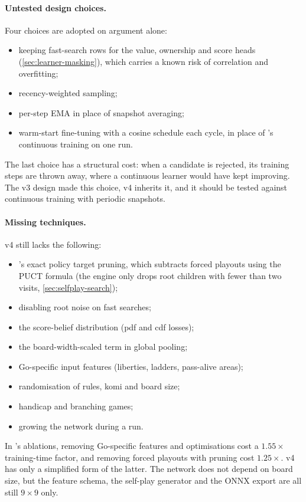 \paragraph{Untested design choices.}
Four choices are adopted on argument alone:
\begin{itemize}
  \item keeping fast-search rows for the value, ownership and score heads
        (\cref{sec:learner-masking}), which carries a known risk of correlation and
        overfitting;
  \item recency-weighted sampling;
  \item per-step EMA in place of snapshot averaging;
  \item warm-start fine-tuning with a cosine schedule each cycle, in place of \katago{}'s
        continuous training on one run.
\end{itemize}
The last choice has a structural cost: when a candidate is rejected, its training steps
are thrown away, where a continuous learner would have kept improving. The v3 design made
this choice, v4 inherits it, and it should be tested against continuous training with
periodic snapshots.

\paragraph{Missing \katago{} techniques.}
v4 still lacks the following:
\begin{itemize}
  \item \katago{}'s exact policy target pruning, which subtracts forced playouts using the
        PUCT formula (the engine only drops root children with fewer than two visits,
        \cref{sec:selfplay-search});
  \item disabling root noise on fast searches;
  \item the score-belief distribution (pdf and cdf losses);
  \item the board-width-scaled term in global pooling;
  \item Go-specific input features (liberties, ladders, pass-alive areas);
  \item randomisation of rules, komi and board size;
  \item handicap and branching games;
  \item growing the network during a run.
\end{itemize}
In \citet{wu2019accelerating}'s ablations, removing Go-specific features and optimisations
cost a $1.55\times$ training-time factor, and removing forced playouts with pruning cost
$1.25\times$. v4 has only a simplified form of the latter. The  network does not depend on
board size, but the feature schema, the self-play generator and the ONNX export are all
still $9\times9$ only.

